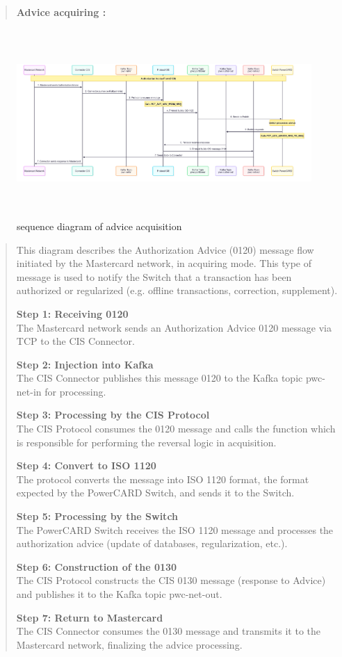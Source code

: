 \documentclass[12pt,a4paper]{report}
\begin{document}
\begin{quote}
\textbf{Advice acquiring :}
\end{quote}

\begin{figure}[H]
\centering
\includegraphics[width=7.05923in,height=2.81006in]{media/image41.png}
\caption{sequence diagram of advice acquisition}
\label{fig:SDAA}
\end{figure}

\begin{quote}
This diagram describes the Authorization Advice (0120) message flow
initiated by the Mastercard network, in acquiring mode. This type of
message is used to notify the Switch that a transaction has been
authorized or regularized (e.g. offline transactions, correction,
supplement).

\textbf{Step 1: Receiving 0120}\\
The Mastercard network sends an Authorization Advice 0120 message via
TCP to the CIS Connector.

\textbf{Step 2: Injection into Kafka}\\
The CIS Connector publishes this message 0120 to the Kafka topic
pwc-net-in for processing.

\textbf{Step 3: Processing by the CIS Protocol}\\
The CIS Protocol consumes the 0120 message and calls the function which
is responsible for performing the reversal logic in acquisition.

\textbf{Step 4: Convert to ISO 1120}\\
The protocol converts the message into ISO 1120 format, the format
expected by the PowerCARD Switch, and sends it to the Switch.

\textbf{Step 5: Processing by the Switch}\\
The PowerCARD Switch receives the ISO 1120 message and processes the
authorization advice (update of databases, regularization, etc.).

\textbf{Step 6: Construction of the 0130}\\
The CIS Protocol constructs the CIS 0130 message (response to Advice)
and publishes it to the Kafka topic pwc-net-out.

\textbf{Step 7: Return to Mastercard}\\
The CIS Connector consumes the 0130 message and transmits it to the
Mastercard network, finalizing the advice processing.
\end{quote}
\end{document}
